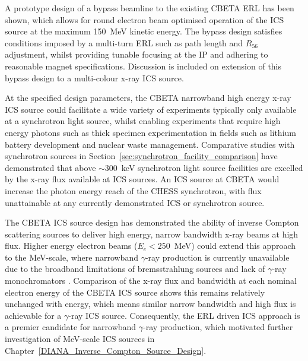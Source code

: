 \documentclass[../main.tex]{subfiles}
\begin{document}
A prototype design of a bypass beamline to the existing CBETA ERL has been shown, which allows for round electron beam optimised operation of the ICS source at the maximum 150~\si{\mega\electronvolt} kinetic energy. The bypass design satisfies conditions imposed by a multi-turn ERL such as path length and $R_{56}$ adjustment, whilst providing tunable focusing at the IP and adhering to reasonable magnet specifications. Discussion is included on extension of this bypass design to a multi-colour x-ray ICS source.  

At the specified design parameters, the CBETA narrowband high energy x-ray ICS source could facilitate a wide variety of experiments typically only available at a synchrotron light source, whilst enabling experiments that require high energy photons such as thick specimen experimentation in fields such as lithium battery development and nuclear waste management. Comparative studies with synchrotron sources in Section~\ref{sec:synchrotron_facility_comparison} have demonstrated that above $\sim300$~\si{\kilo\electronvolt} synchrotron light source facilities are excelled by the x-ray flux available at ICS sources. An ICS source at CBETA would increase the photon energy reach of the CHESS \cite{CHESSstructuralmaterialsbeamline} synchrotron, with flux unattainable at any currently demonstrated ICS or synchrotron source.  

The CBETA ICS source design has demonstrated the ability of inverse Compton scattering sources to deliver high energy, narrow bandwidth x-ray beams at high flux. Higher energy electron beams ($E_{e}<250$~\si{\mega\electronvolt}) could extend this approach to the \si{\mega\electronvolt}-scale, where narrowband $\gamma$-ray production is currently unavailable due to the broadband limitations of bremsstrahlung sources and lack of $\gamma$-ray monochromators \cite{jentschel2012gamma}. Comparison of the x-ray flux and bandwidth at each nominal electron energy of the CBETA ICS source shows this remains relatively unchanged with energy, which means similar narrow bandwidth and high flux is achievable for a $\gamma$-ray ICS source. Consequently, the ERL driven ICS approach is a premier candidate for narrowband $\gamma$-ray production, which motivated further investigation of \si{\mega\electronvolt}-scale ICS sources in Chapter~\ref{DIANA_Inverse_Compton_Source_Design}.
\end{document}
